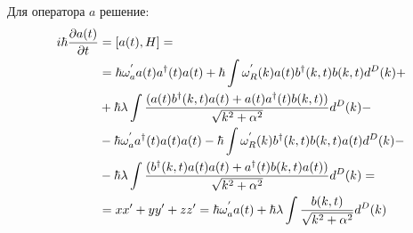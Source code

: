 Для оператора $a$ решение:
\begin{equation}\notag
    \begin{split}
        i \hbar \frac{\partial a(t)}{\partial t} & = [a(t), H] = \\
        & = \hbar \omega^{'}_a a(t) a^{\dagger}(t) a(t) + \hbar \int \omega^{'}_{R}(k) a(t) b^{\dagger}(k,t) b(k,t) d^{D}(k) + \\
        & + \hbar \lambda \int \frac{(a(t) b^{\dagger}(k,t) a(t) + a(t) a^{\dagger}(t) b(k,t))}{\sqrt{k^{2} + \alpha^{2}}} d^{D}(k) - \\
        & - \hbar \omega^{'}_a a^{\dagger}(t) a(t) a(t) - \hbar \int \omega^{'}_{R}(k) b^{\dagger}(k,t) b(k,t) a(t) d^{D}(k) - \\
        & - \hbar \lambda \int \frac{(b^{\dagger}(k,t) a(t) a(t) + a^{\dagger}(t) b(k,t) a(t))}{\sqrt{k^{2} + \alpha^{2}}} d^{D}(k) = \\
        & = xx' + yy' + zz' = \hbar \omega^{'}_a a(t) + \hbar \lambda \int \frac{b(k,t)}{\sqrt{k^{2} + \alpha^{2}}} d^{D}(k)
    \end{split}
\end{equation}

